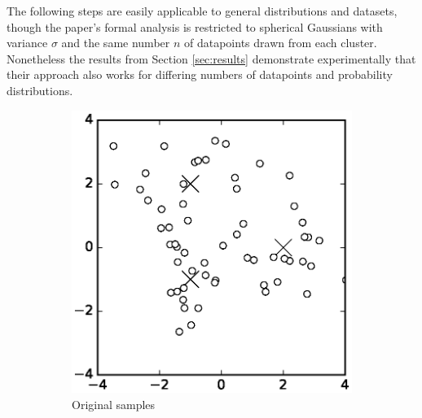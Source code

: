 \documentclass[10pt,a4paper]{article}
\begin{document}
The following steps are easily applicable to general distributions and datasets, though the paper's formal analysis is restricted to spherical Gaussians with variance $\sigma$ and the same number $n$ of datapoints drawn from each cluster.
Nonetheless the results from Section \ref{sec:results} demonstrate experimentally that their approach also works for differing numbers of datapoints and probability distributions.

\begin{figure}[h!]
  \centering
  \begin{subfigure}{0.3\textwidth}
    \centering
    \includegraphics[width=\textwidth]{figures/denoising-noisy}
    \caption{Original samples}
    \label{fig:noisy}
  \end{subfigure}
  \hspace{1cm}
  \begin{subfigure}{0.3\textwidth}
    \centering

\end{subfigure}
\end{figure}
\end{document}
